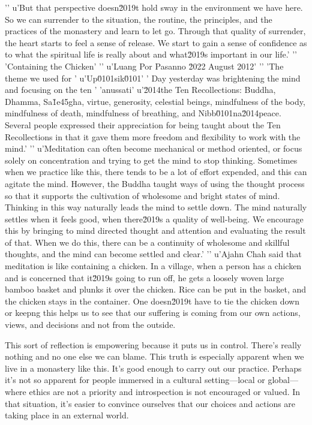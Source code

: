 '\n'
u'But that perspective doesn\u2019t hold sway in the environment we have here. So we can surrender to the situation, the routine, the principles, and the practices of the monastery and learn to let go. Through that quality of surrender, the heart starts to feel a sense of release. We start to gain a sense of confidence as to what the spiritual life is really about and what\u2019s important in our life.'
'\n'
'Containing the Chicken'
'\n'
u'Luang Por Pasanno \u2022 August 2012'
'\n'
'The theme we used for '
u'Up\u0101sik\u0101'
' Day yesterday was brightening the mind and focusing on the ten '
'anussati'
u'\u2014the Ten Recollections: Buddha, Dhamma, Sa\u1e45gha, virtue, generosity, celestial beings, mindfulness of the body, mindfulness of death, mindfulness of breathing, and Nibb\u0101na\u2014peace. Several people expressed their appreciation for being taught about the Ten Recollections in that it gave them more freedom and flexibility to work with the mind.'
'\n'
u'Meditation can often become mechanical or method oriented, or focus solely on concentration and trying to get the mind to stop thinking. Sometimes when we practice like this, there tends to be a lot of effort expended, and this can agitate the mind. However, the Buddha taught ways of using the thought process so that it supports the cultivation of wholesome and bright states of mind. Thinking in this way naturally leads the mind to settle down. The mind naturally settles when it feels good, when there\u2019s a quality of well-being. We encourage this by bringing to mind directed thought and attention and evaluating the result of that. When we do this, there can be a continuity of wholesome and skillful thoughts, and the mind can become settled and clear.'
'\n'
u'Ajahn Chah said that meditation is like containing a chicken. In a village, when a person has a chicken and is concerned that it\u2019s going to run off, he gets a loosely woven large bamboo basket and plunks it over the chicken. Rice can be put in the basket, and the chicken stays in the container. One doesn\u2019t have to tie the chicken down or keepng this helps us to see that our suffering is coming from 
our own actions, views, and decisions and not from the outside.

This sort of reflection is empowering because it puts us in control. 
There's really nothing and no one else we can blame. This truth is 
especially apparent when we live in a monastery like this. It's good 
enough to carry out our practice. Perhaps it's not so apparent for 
people immersed in a cultural setting---local or global---where ethics 
are not a priority and introspection is not encouraged or valued. In 
that situation, it's easier to convince ourselves that our choices and 
actions are taking place in an external world.

